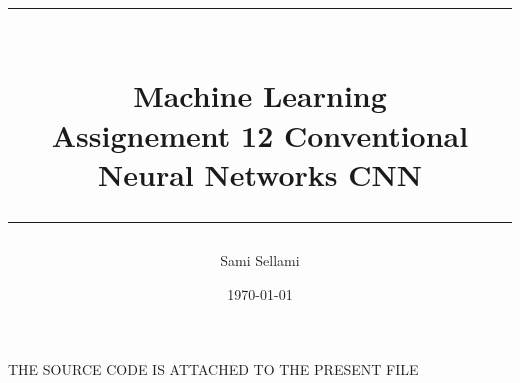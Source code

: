 \documentclass[12pt,a4paper]{report}
\title{
\rule{15cm}{1pt} \\
\Large {\bfseries Machine Learning} \\
\Large {\bfseries Assignement 12 Conventional Neural Networks CNN}\\
\rule{15cm}{1pt}}
\author{Sami Sellami}
\date{\today}
\begin{document}
\setcounter{page}{1}
\setcounter{secnumdepth}{1}
	
\selectfont

\maketitle

\titlelabel{\thetitle)\quad}
\titlespacing{\chapter}{0cm}{0cm}{0cm}
\titlespacing{\section}{0.2cm}{0cm}{0cm}

THE SOURCE CODE IS ATTACHED TO THE PRESENT FILE 
\end{document}
